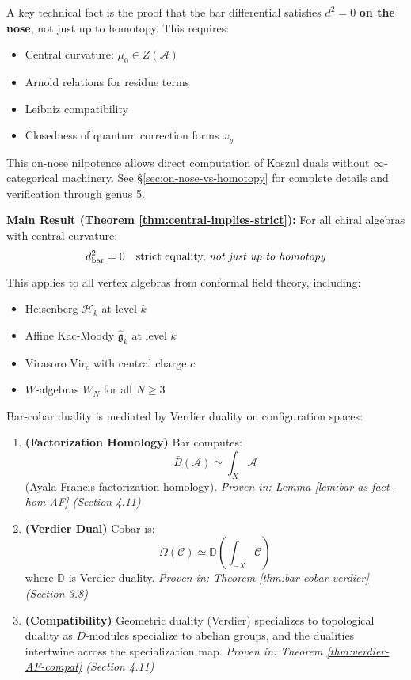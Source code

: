 A key technical fact is the proof that the bar differential satisfies $d^2 = 0$ 
\textbf{on the nose}, not just up to homotopy. This requires:
\begin{itemize}
\item Central curvature: $\mu_0 \in Z(\mathcal{A})$
\item Arnold relations for residue terms
\item Leibniz compatibility
\item Closedness of quantum correction forms $\omega_g$
\end{itemize}

This on-nose nilpotence allows direct computation of Koszul duals without $\infty$-categorical 
machinery. See \S\ref{sec:on-nose-vs-homotopy} for complete details and verification through genus 5.

\textbf{Main Result (Theorem \ref{thm:central-implies-strict}):} For all chiral algebras with 
central curvature:
$$d_{\text{bar}}^2 = 0 \quad \text{strict equality, \textit{not just up to homotopy}}$$

This applies to all vertex algebras from conformal field theory, including:
\begin{itemize}
\item Heisenberg $\mathcal{H}_k$ at level $k$
\item Affine Kac-Moody $\widehat{\mathfrak{g}}_k$ at level $k$  
\item Virasoro $\text{Vir}_c$ with central charge $c$
\item $W$-algebras $W_N$ for all $N \geq 3$
\end{itemize}

\begin{maintheorem}\label{mainthm:NAP-complete}
Bar-cobar duality is mediated by Verdier duality on configuration spaces:

\begin{enumerate}
\item \textbf{(Factorization Homology)} Bar computes:
$$\bar{B}(\mathcal{A}) \simeq \int_X \mathcal{A}$$
(Ayala-Francis factorization homology).
\textit{Proven in: Lemma \ref{lem:bar-as-fact-hom-AF} (Section 4.11)}

\item \textbf{(Verdier Dual)} Cobar is:
$$\Omega(\mathcal{C}) \simeq \mathbb{D}\left(\int_{-X} \mathcal{C}\right)$$
where $\mathbb{D}$ is Verdier duality.
\textit{Proven in: Theorem \ref{thm:bar-cobar-verdier} (Section 3.8)}

\item \textbf{(Compatibility)} Geometric duality (Verdier) specializes to topological duality as $D$-modules specialize to abelian groups, and the dualities intertwine across the specialization map.
\textit{Proven in: Theorem \ref{thm:verdier-AF-compat} (Section 4.11)}
\end{enumerate}
\end{maintheorem}

